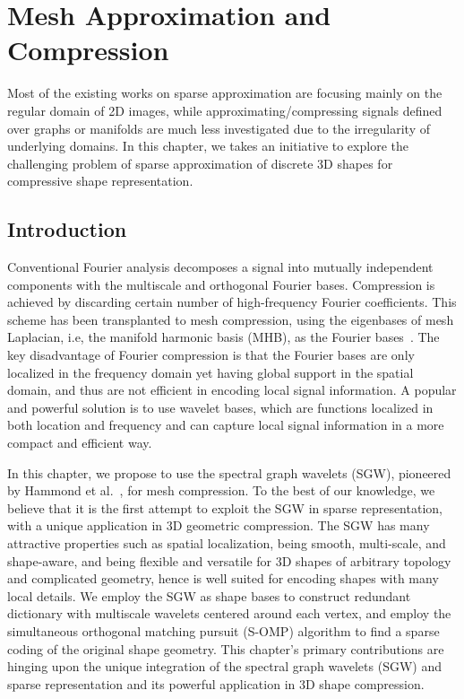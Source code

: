 \chapter{Mesh Approximation and Compression}

Most of the existing works on sparse approximation are focusing mainly
on the regular domain of 2D images, while approximating/compressing
signals defined over graphs or manifolds are much less investigated
due to the irregularity of underlying domains. In this chapter, we
takes an initiative to explore the challenging problem of sparse
approximation of discrete 3D shapes for compressive shape representation.

\section{Introduction}

Conventional Fourier analysis decomposes a signal into mutually
independent components with the multiscale and orthogonal Fourier
bases. Compression is achieved by discarding certain number of
high-frequency Fourier coefficients. This scheme has been transplanted
to mesh compression, using the eigenbases of mesh Laplacian, i.e, the
manifold harmonic basis (MHB), as the Fourier
bases~\cite{Karni2000}. The key disadvantage of Fourier
compression is that the Fourier bases are only localized in the
frequency domain yet having global support in the spatial domain, and
thus are not efficient in encoding local signal information. A popular
and powerful solution is to use wavelet bases, which are functions
localized in both location and frequency and can capture local signal
information in a more compact and efficient way.

In this chapter, we propose to use the spectral graph wavelets (SGW),
pioneered by Hammond et al.~\cite{Hammond2011}, for mesh
compression. To the best of our knowledge, we believe that it is the
first attempt to exploit the SGW in sparse representation, with a
unique application in 3D geometric compression. The SGW has many
attractive properties such as spatial localization, being smooth,
multi-scale, and shape-aware, and being flexible and versatile for 3D
shapes of arbitrary topology and complicated geometry, hence is well
suited for encoding shapes with many local details. We employ the SGW
as shape bases to construct redundant dictionary with multiscale
wavelets centered around each vertex, and employ the simultaneous
orthogonal matching pursuit (S-OMP) algorithm to find a sparse coding
of the original shape geometry. This chapter's primary contributions are
hinging upon the unique integration of the spectral graph wavelets
(SGW) and sparse representation and its powerful application in 3D
shape compression.

